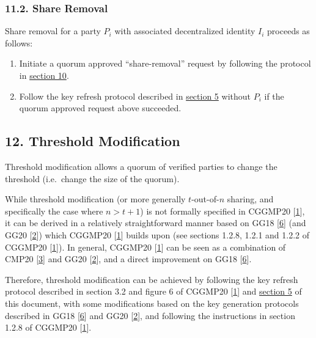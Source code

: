 \documentclass[
]{article}
\providecommand{\tightlist}{%
  \setlength{\itemsep}{0pt}\setlength{\parskip}{0pt}}
\begin{document}
\hypertarget{share-removal}{%
\subsubsection{11.2. Share Removal}\label{share-removal}}

Share removal for a party \(P_i\) with associated decentralized identity
\(I_i\) proceeds as follows:

\begin{enumerate}
\def\labelenumi{\arabic{enumi}.}
\tightlist
\item
  Initiate a quorum approved ``share-removal'' request by following the
  protocol in \protect\hyperlink{quorum-approved-request}{section 10}.
\item
  Follow the key refresh protocol described in
  \protect\hyperlink{key-refresh}{section 5} without \(P_i\) if the
  quorum approved request above succeeded.
\end{enumerate}

\hypertarget{threshold-modification}{%
\subsection{12. Threshold Modification}\label{threshold-modification}}

Threshold modification allows a quorum of verified parties to change the
threshold (i.e.~change the size of the quorum).

While threshold modification (or more generally \(t\)-out-of-\(n\)
sharing, and specifically the case where \(n > t+1\)) is not formally
specified in CGGMP20 {[}\protect\hyperlink{ref-cggmp20}{1}{]}, it can be
derived in a relatively straightforward manner based on GG18
{[}\protect\hyperlink{ref-gg18}{6}{]} (and GG20
{[}\protect\hyperlink{ref-gg20}{2}{]}) which CGGMP20
{[}\protect\hyperlink{ref-cggmp20}{1}{]} builds upon (see sections
1.2.8, 1.2.1 and 1.2.2 of CGGMP20
{[}\protect\hyperlink{ref-cggmp20}{1}{]}). In general, CGGMP20
{[}\protect\hyperlink{ref-cggmp20}{1}{]} can be seen as a combination of
CMP20 {[}\protect\hyperlink{ref-cmp20}{3}{]} and GG20
{[}\protect\hyperlink{ref-gg20}{2}{]}, and a direct improvement on GG18
{[}\protect\hyperlink{ref-gg18}{6}{]}.

Therefore, threshold modification can be achieved by following the key
refresh protocol described in section 3.2 and figure 6 of CGGMP20
{[}\protect\hyperlink{ref-cggmp20}{1}{]} and
\protect\hyperlink{key-refresh}{section 5} of this document, with some
modifications based on the key generation protocols described in GG18
{[}\protect\hyperlink{ref-gg18}{6}{]} and GG20
{[}\protect\hyperlink{ref-gg20}{2}{]}, and following the instructions in
section 1.2.8 of CGGMP20 {[}\protect\hyperlink{ref-cggmp20}{1}{]}.
\end{document}
